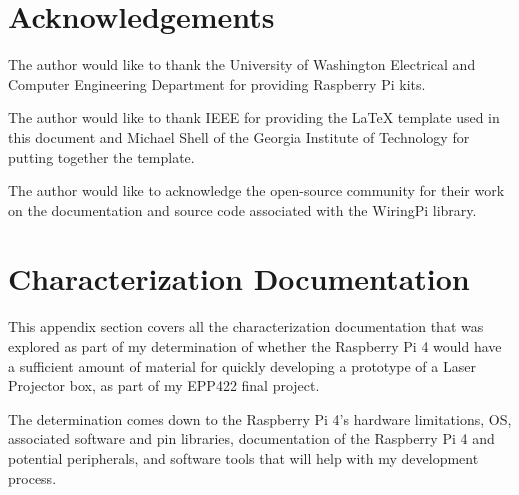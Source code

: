 \documentclass[journal]{IEEEtran}
\begin{document}
    \section{Acknowledgements}
    The author would like to thank the University of Washington Electrical and Computer Engineering Department for providing Raspberry Pi kits.

    The author would like to thank IEEE for providing the LaTeX template used in this document and Michael Shell of the Georgia Institute of Technology for putting together the template.

    The author would like to acknowledge the open-source community for their work on the documentation and source code associated with the WiringPi library. 

    \appendices
    \section{Characterization Documentation}
    This appendix section covers all the characterization documentation that was explored as part of my determination of whether the Raspberry Pi 4 would have a sufficient amount of material for quickly developing a prototype of a
    Laser Projector box, as part of my EPP422 final project.
    
    The determination comes down to the Raspberry Pi 4's hardware limitations, OS, associated software and pin libraries, documentation of the Raspberry Pi 4 and potential peripherals, and software tools that 
    will help with my development process.
\end{document}
